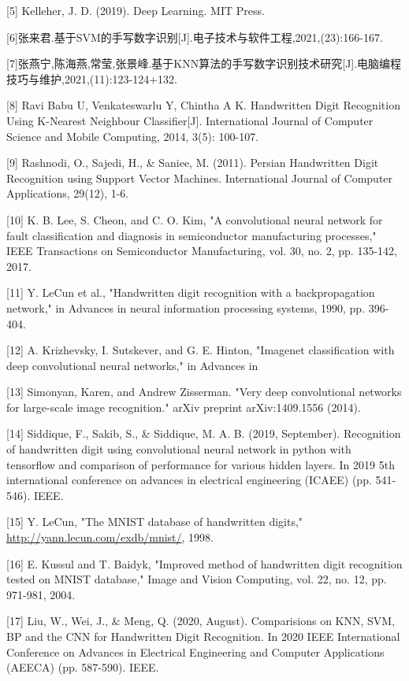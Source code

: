 \documentclass[11pt]{article}
\begin{document}
[5] Kelleher, J. D. (2019). Deep Learning. MIT Press.

[6]张来君.基于SVM的手写数字识别[J].电子技术与软件工程,2021,(23):166-167.

[7]张燕宁,陈海燕,常莹,张景峰.基于KNN算法的手写数字识别技术研究[J].电脑编程技巧与维护,2021,(11):123-124+132.

[8] Ravi Babu U, Venkateswarlu Y, Chintha A K. Handwritten Digit Recognition Using K-Nearest Neighbour Classifier[J]. International Journal of Computer Science and Mobile Computing, 2014, 3(5): 100-107.

[9] Rashnodi, O., Sajedi, H., \& Saniee, M. (2011). Persian Handwritten Digit Recognition using Support Vector Machines. International Journal of Computer Applications, 29(12), 1-6.

[10] K. B. Lee, S. Cheon, and C. O. Kim, "A convolutional neural  network for fault classification and diagnosis in semiconductor  manufacturing processes," IEEE Transactions on Semiconductor  Manufacturing, vol. 30, no. 2, pp. 135-142, 2017.

[11] Y. LeCun et al., "Handwritten digit recognition with a backpropagation network," in Advances in neural information  processing systems, 1990, pp. 396-404.

[12]  A. Krizhevsky, I. Sutskever, and G. E. Hinton, "Imagenet  classification with deep convolutional neural networks," in  Advances in

[13] Simonyan, Karen, and Andrew Zisserman. "Very deep convolutional networks for large-scale image recognition." arXiv preprint arXiv:1409.1556 (2014).

[14] Siddique, F., Sakib, S., \& Siddique, M. A. B. (2019, September). Recognition of handwritten digit using convolutional neural network in python with tensorflow and comparison of performance for various hidden layers. In 2019 5th international conference on advances in electrical engineering (ICAEE) (pp. 541-546). IEEE.

[15]  Y. LeCun, "The MNIST database of handwritten digits,"  \url{http://yann.lecun.com/exdb/mnist/}, 1998.

[16]  E. Kussul and T. Baidyk, "Improved method of handwritten digit  recognition tested on MNIST database," Image and Vision  Computing, vol. 22, no. 12, pp. 971-981, 2004.

[17] Liu, W., Wei, J., \& Meng, Q. (2020, August). Comparisions on KNN, SVM, BP and the CNN for Handwritten Digit Recognition. In 2020 IEEE International Conference on Advances in Electrical Engineering and Computer Applications (AEECA) (pp. 587-590). IEEE.
\end{document}
